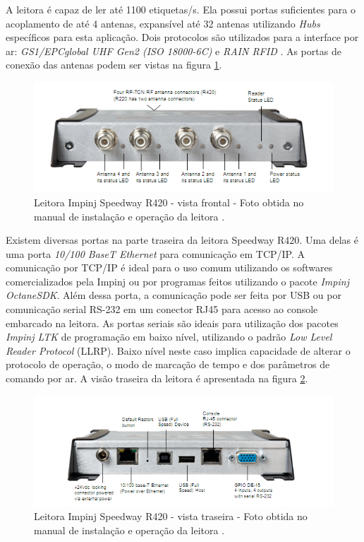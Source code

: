  A leitora é capaz de ler até 1100 etiquetas/s. Ela possui portas suficientes para o acoplamento de até 4 antenas, expansível até 32 antenas utilizando \textit{Hubs} específicos para esta aplicação. Dois protocolos são utilizados para a interface por ar: \textit{GS1/EPCglobal UHF Gen2 (ISO 18000-6C)} e \textit{RAIN RFID} \cite{SpeedwayRDatasheet}\cite{SpeedwayRUserManual}. As portas de conexão das antenas podem ser vistas na figura \ref{fig:SpeedwayR420front}.
 
     \begin{figure}[H]
        \centering
        \includegraphics[width=0.6\linewidth]{figs/Metodologia/SpeedwayR420-front-view.png}
        \caption{Leitora Impinj Speedway R420 - vista frontal - Foto obtida no manual de instalação e operação da leitora \cite{SpeedwayRUserManual}.}
        \label{fig:SpeedwayR420front}
    \end{figure}
 
 Existem diversas portas na parte traseira da leitora Speedway R420. Uma delas é uma porta \textit{10/100 BaseT Ethernet} para comunicação em TCP/IP. A comunicação por TCP/IP é ideal para o uso comum utilizando os softwares comercializados pela Impinj ou por programas feitos utilizando o pacote \textit{Impinj OctaneSDK}. Além dessa porta, a comunicação pode ser feita por USB ou por comunicação serial RS-232 em um conector RJ45 para acesso ao console embarcado na leitora. As portas seriais são ideais para utilização dos pacotes \textit{Impinj LTK} de programação em baixo nível, utilizando o padrão \textit{Low Level Reader Protocol} (LLRP). Baixo nível neste caso implica capacidade de alterar o protocolo de operação, o modo de marcação de tempo e dos parâmetros de comando por ar\cite{GS1-LLRP}\cite{SpeedwayRUserManual}. A visão traseira da leitora é apresentada na figura \ref{fig:SpeedwayR420back}.
 
\begin{figure}[H]
    \centering
    \includegraphics[width=0.6\linewidth]{figs/Metodologia/SpeedwayR420-back-view.png}
    \caption{Leitora Impinj Speedway R420 - vista traseira - Foto obtida no manual de instalação e operação da leitora \cite{SpeedwayRUserManual}.}
    \label{fig:SpeedwayR420back}
\end{figure}
 
